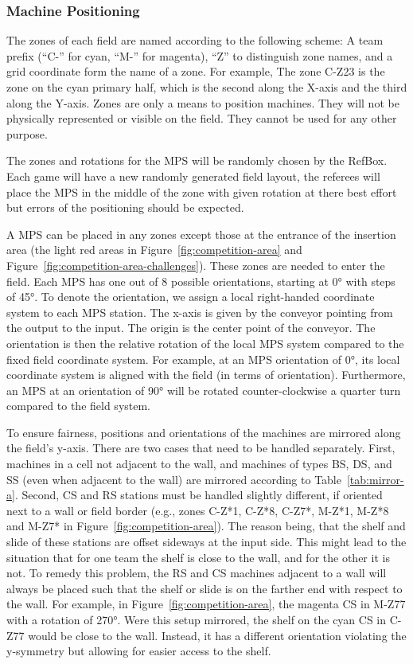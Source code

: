 \documentclass[12pt,twoside]{article}
\newcommand{\reffig}[1]{Figure~\ref{#1}}
\newcommand{\reftab}[1]{Table~\ref{#1}}
\begin{document}
\subsubsection{Machine Positioning}
\label{sec:machine-swapping}
The zones of each field are named according to the following scheme:
A team prefix (``C-'' for cyan, ``M-'' for
magenta), ``Z'' to distinguish zone names, and a grid coordinate form the name
of a zone.
For example, The zone C-Z23 is the zone on the cyan primary half, which is
the second along the X-axis and the third along the Y-axis.
Zones are only a means to position machines. They will not be physically
represented or visible on the field. They cannot be used for any other
purpose.

The zones and rotations for the MPS will be randomly chosen by the RefBox.
Each game will have a new randomly generated field layout, the referees will
place the MPS in the middle of the zone with given rotation at there best effort
but errors of the positioning should be expected.

A MPS can be placed in any zones except those at the entrance of the
insertion area (the light red areas in \reffig{fig:competition-area} and
\reffig{fig:competition-area-challenges}).
These zones are needed to enter the field. Each MPS has one out of 8 possible
orientations, starting at \ang{0} with steps of \ang{45}. To denote
the orientation, we assign a local right-handed coordinate system to
each MPS station. The x-axis is given by the conveyor pointing from
the output to the input. The origin is the center point of the
conveyor. The orientation is then the relative rotation of the local
MPS system compared to the fixed field coordinate system. For example,
at an MPS orientation of \ang{0}, its local coordinate system is
aligned with the field (in terms of orientation). Furthermore, an MPS
at an orientation of \ang{90} will be rotated counter-clockwise a
quarter turn compared to the field system.

To ensure fairness, positions and orientations of the machines are mirrored
along the field's y-axis. There are two cases that need to be handled
separately. First, machines in a cell not adjacent to the wall, and machines of
types BS, DS, and SS (even when adjacent to the wall) are mirrored according to
\reftab{tab:mirror-a}. Second, CS and RS stations must be handled slightly
different, if oriented next to a wall or field border
(e.g., zones C-Z*1, C-Z*8, C-Z7*, M-Z*1, M-Z*8 and M-Z7* in
\reffig{fig:competition-area}).
The reason being, that the shelf and slide of these stations are
offset sideways at the input side. This might lead to the situation that for one
team the shelf is close to the wall, and for the other it is not. To remedy this
problem, the RS and CS machines adjacent to a wall will always be placed such
that the shelf or slide is on the farther end with respect to the wall. For
example, in \reffig{fig:competition-area}, the magenta CS in M-Z77 with a
rotation of \ang{270}. Were this setup mirrored, the shelf on the cyan CS in
C-Z77 would be close to the wall. Instead, it has a different orientation
violating the y-symmetry but allowing for easier access to the shelf.
\end{document}
